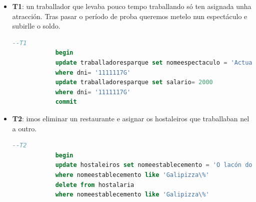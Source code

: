 \documentclass[12pt,a4paper]{book}
\theoremstyle{definition}
\theoremstyle{break}
\begin{document}
	\begin{itemize}
		\item \textbf{T1}: un traballador que levaba pouco tempo traballando só ten asignada unha atracción. Tras pasar o período de proba queremos metelo nun espectáculo e subirlle o soldo.
		\begin{lstlisting}[language=sql,style=sql,tabsize=5, escapechar={|},
			keywordstyle=\color{blue}\ttfamily,
			stringstyle=\color{red}\ttfamily]
			--T1
			begin
			update traballadoresparque set nomeespectaculo = 'Actuacion Musical'
			where dni= '1111117G'
			update traballadoresparque set salario= 2000
			where dni= '1111117G'
			commit
		\end{lstlisting}
		\item \textbf{T2}: imos eliminar un restaurante e asignar os hostaleiros que traballaban nel a outro.
		\begin{lstlisting}[language=sql,style=sql,tabsize=5, escapechar={|},
			keywordstyle=\color{blue}\ttfamily,
			stringstyle=\color{red}\ttfamily]
			--T2
			begin
			update hostaleiros set nomeestablecemento = 'O lacón do Antonio'
			where nomeestablecemento like 'Galipizza\%'
			delete from hostalaria
			where nomeestablecemento like 'Galipizza\%'
			

\end{lstlisting}
\end{itemize}
\end{document}
